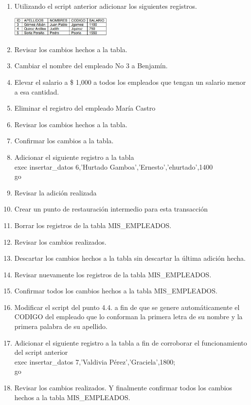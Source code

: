 \begin{enumerate}[1.]
	\item Utilizando el script anterior adicionar los siguientes registros.
	\begin{center}
	\includegraphics[width=5cm]{./Imagenes/imagen0105} 
	\end{center}
	\item Revisar los cambios hechos a la tabla.
	\item Cambiar el nombre del empleado No 3 a Benjamín.
	\item Elevar el salario a \$ 1,000 a todos los empleados que tengan un salario menor a esa cantidad.
	\item Eliminar el registro del empleado María Castro
	\item Revisar los cambios hechos a la tabla.
	\item Confirmar los cambios a la tabla.
	\item Adicionar el siguiente registro a la tabla
	\\exec insertar\_datos 6,'Hurtado Gamboa','Ernesto','ehurtado',1400
	\\ go
	\item Revisar la adición realizada
	\item Crear un punto de restauración intermedio para esta transacción
	\item Borrar los registros de la tabla MIS\_EMPLEADOS.
	\item Revisar los cambios realizados.
	\item Descartar los cambios hechos a la tabla sin descartar la última adición hecha.
	\item Revisar nuevamente los registros de la tabla MIS\_EMPLEADOS.
	\item Confirmar todos los cambios hechos a la tabla MIS\_EMPLEADOS.
	\item Modificar el script del punto 4.4. a fin de que se genere automáticamente el CODIGO del empleado que lo conforman la primera letra de su nombre y la primera palabra de su apellido.
	\item Adicionar el siguiente registro a la tabla a fin de corroborar el funcionamiento del script anterior
           \\exec insertar\_datos 7,'Valdivia Pérez','Graciela',1800;
           \\go
	\item Revisar los cambios realizados. Y finalmente confirmar todos los cambios hechos a la tabla MIS\_EMPLEADOS.
\end{enumerate} 